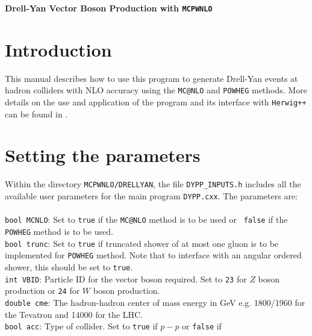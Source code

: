 \documentclass[12pt,a4paper,oneside]{article}
\begin{document}
\begin{center}
\Large \textbf {Drell-Yan Vector Boson Production with {\tt MCPWNLO}} \\
\end{center}
\section{Introduction}
This manual describes how to use this program to generate Drell-Yan events at hadron colliders with NLO accuracy using the {\tt MC@NLO} \cite{Frixione:2002ik} and {\tt POWHEG} \cite{Nason:2004rx} methods. More details on the use and application of the program and its interface with {\tt Herwig++} \cite{Bahr:2008pv} can be found in \cite{LatundeDada:2007jg, seyi}.
\section{Setting the parameters}
Within the directory {\tt MCPWNLO/DRELLYAN}, the file {\tt DYPP\_INPUTS.h} includes all the available user parameters
for the main program {\tt DYPP.cxx}. The parameters are:\\
\\
{\tt bool MCNLO}: Set to {\tt true} if the {\tt MC@NLO} method is to be used or {\tt
  false} if the {\tt POWHEG} method is to be used. \\
{\tt bool trunc}: Set to {\tt true} if truncated shower of at most one gluon is to be
implemented for {\tt POWHEG} method. Note that to interface with an angular ordered
shower, this should be set to {\tt true}. \\
{\tt int VBID}: Particle ID for the vector boson required. Set to {\tt 23} for $Z$ boson
production or {\tt 24} for $W$ boson production. \\
{\tt double cme}: The hadron-hadron center of mass energy in GeV e.g. 1800/1960 for the
Tevatron and 14000 for the LHC. \\
{\tt bool acc}: Type of collider. Set to {\tt true} if $p-p$ or {\tt false} if
\end{document}

